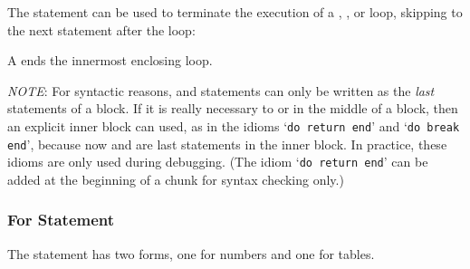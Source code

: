 \documentclass[11pt,twoside,draft]{article}
\newcommand{\NOTE}{\par\medskip\noindent\emph{NOTE}: }
\begin{document}
The  statement can be used to terminate the execution of a
, , or  loop,
skipping to the next statement after the loop:
\begin{Produc}
\end{Produc}%
A  ends the innermost enclosing loop.

\NOTE
For syntactic reasons,  and 
statements can only be written as the \emph{last} statements of a block.
If it is really necessary to  or  in the
middle of a block,
then an explicit inner block can used,
as in the idioms
`\verb|do return end|' and
`\verb|do break end|',
because now  and  are last statements in the inner block.
In practice,
these idioms are only used during debugging.
(The idiom `\verb|do return end|' can be added at the beginning of a chunk
for syntax checking only.)

\subsubsection{For Statement} \label{for}

The  statement has two forms,
one for numbers and one for tables.
\end{document}
